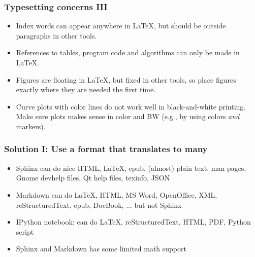 \documentclass{beamer}
\begin{document}
\begin{frame}
\frametitle{Typesetting concerns III}

\begin{itemize}
 \item<2-> Index words can appear anywhere in {\LaTeX}, but should be outside
   paragraphs in other tools.

 \item<3-> References to tables, program code and algorithms can only be
   made in {\LaTeX}.

 \item<4-> Figures are floating in {\LaTeX}, but fixed in other tools, so place
   figures exactly where they are needed the first time.

 \item<5-> Curve plots with color lines do not work well in black-and-white
   printing. Make sure plots makes sense in color and BW (e.g., by
   using colors \emph{and} markers).
\end{itemize}

\noindent
\end{frame}

\begin{frame}
\frametitle{Solution I: Use a format that translates to many}

\begin{itemize}
 \item Sphinx can do nice HTML, {\LaTeX}, epub, (almost) plain text,
   man pages, Gnome devhelp files, Qt help files, texinfo, JSON

 \item Markdown can do {\LaTeX}, HTML, MS Word, OpenOffice, XML,
   reStructuredText, epub, DocBook, ... but not Sphinx

 \item IPython notebook: can do {\LaTeX}, reStructuredText, HTML, PDF,
   Python script

 \item Sphinx and Markdown has some limited math support
\end{itemize}

\noindent
\end{frame}
\end{document}
